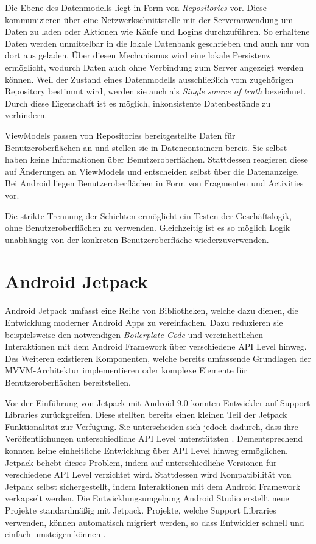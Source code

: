 Die Ebene des Datenmodells liegt in Form von \textit{Repositories} vor.
Diese kommunizieren über eine Netzwerkschnittstelle mit der Serveranwendung um Daten zu laden oder Aktionen wie Käufe und Logins durchzuführen.
So erhaltene Daten werden unmittelbar in die lokale Datenbank geschrieben und auch nur von dort aus geladen.
Über diesen Mechanismus wird eine lokale Persistenz ermöglicht, wodurch Daten auch ohne Verbindung zum Server angezeigt werden können.
Weil der Zustand eines Datenmodells ausschließlich vom zugehörigen Repository bestimmt wird, werden sie auch als \textit{Single source of truth} bezeichnet.
Durch diese Eigenschaft ist es möglich, inkonsistente Datenbestände zu verhindern.

ViewModels passen von Repositories bereitgestellte Daten für Benutzeroberflächen an und stellen sie in Datencontainern bereit.
Sie selbst haben keine Informationen über Benutzeroberflächen.
Stattdessen reagieren diese auf Änderungen an ViewModels und entscheiden selbst über die Datenanzeige.
Bei Android liegen Benutzeroberflächen in Form von Fragmenten und Activities vor.

Die strikte Trennung der Schichten ermöglicht ein Testen der Geschäftslogik, ohne Benutzeroberflächen zu verwenden.
Gleichzeitig ist es so möglich Logik unabhängig von der konkreten Benutzeroberfläche wiederzuverwenden.

\section{Android Jetpack}
\label{sec:app:jetpack}
Android Jetpack umfasst eine Reihe von Bibliotheken, welche dazu dienen, die Entwicklung moderner Android Apps zu vereinfachen.
Dazu reduzieren sie beispielsweise den notwendigen \textit{Boilerplate Code} und vereinheitlichen Interaktionen mit dem Android Framework über verschiedene API Level hinweg.
Des Weiteren existieren Komponenten, welche bereits umfassende Grundlagen der MVVM-Architektur implementieren oder komplexe Elemente für Benutzeroberflächen bereitstellen.

Vor der Einführung von Jetpack mit Android 9.0 konnten Entwickler auf Support Libraries zurückgreifen.
Diese stellten bereits einen kleinen Teil der Jetpack Funktionalität zur Verfügung.
Sie unterscheiden sich jedoch dadurch, dass ihre Veröffentlichungen unterschiedliche API Level unterstützten \autocite{supportlibrariesversions}.
Dementsprechend konnten keine einheitliche Entwicklung über API Level hinweg ermöglichen.
Jetpack behebt dieses Problem, indem auf unterschiedliche Versionen für verschiedene API Level verzichtet wird.
Stattdessen wird Kompatibilität von Jetpack selbst sichergestellt, indem Interaktionen mit dem Android Framework verkapselt werden.
Die Entwicklungsumgebung Android Studio erstellt neue Projekte standardmäßig mit Jetpack.
Projekte, welche Support Libraries verwenden, können automatisch migriert werden, so dass Entwickler schnell und einfach umsteigen können \autocite{androidxmigration}.

